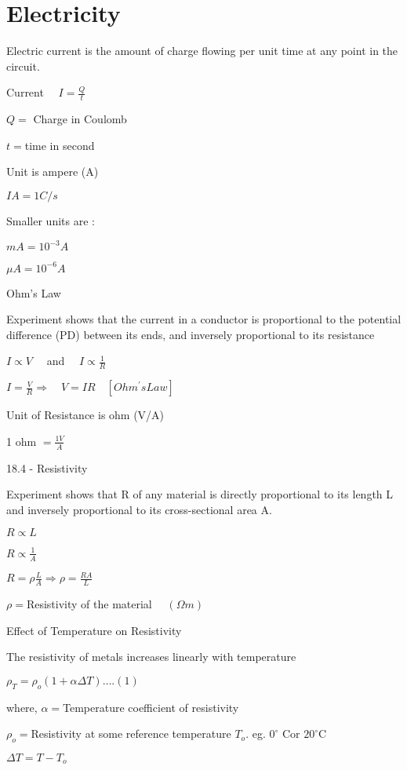 \documentclass{extarticle}
\begin{document}
\section{Electricity}
\markStart[100]
Electric current is the amount of charge flowing per
unit time at any point in the circuit.


Current $\quad I=\frac{Q}{t}$

$Q=$ Charge in Coulomb

$t=$time in second

Unit is ampere (A)

$I A=1 C / s$

Smaller units are :

$m A=10^{-3} A$

$\mu A=10^{-6} A$




Ohm’s Law

Experiment shows that the current in a conductor is
proportional to the potential difference (PD) between
its ends, and inversely proportional to its resistance

$I \propto V \quad$ and $\quad I \propto \frac{1}{R}$

$I=\frac{V}{R} \Rightarrow \quad V=I R \quad\left[O h m^{\prime} s L a w\right]$

Unit of Resistance is ohm (V/A)

1 ohm $=\frac{1 V}{A}$




18.4 - Resistivity

Experiment shows that R of any material is directly
proportional to its length L and inversely proportional
to its cross-sectional area A.

$R \propto L$

$R \propto \frac{1}{A}$

$R=\rho \frac{L}{A} \Rightarrow \rho=\frac{R A}{L}$

$\rho=$Resistivity of the
material $\quad(\Omega m)$

Effect of Temperature on Resistivity

The resistivity of metals increases linearly with temperature

$\rho_{T}=\rho_{o}(1+\alpha \Delta T) \ldots .(1)$

where, $\alpha=$Temperature coefficient of resistivity

$\rho_{o}=$Resistivity at some reference temperature $T_{o} .$ eg. $0^{\circ}$ Cor $20^{\circ} \mathrm{C}$

$\Delta T=T-T_{o}$
\end{document}
